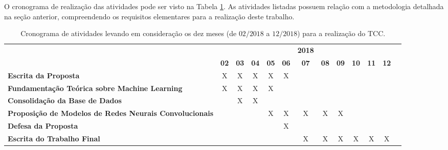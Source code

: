 
O cronograma de realização das atividades pode ser visto na Tabela \ref{tab:cronograma}. As atividades listadas possuem relação com a metodologia detalhada na seção anterior, compreendendo os requisitos elementares para a realização deste trabalho.
\newline

\begin{table}
\caption{Cronograma de atividades levando em consideração os dez meses (de $02/2018$ a $12/2018$) para a realização do TCC.}
\label{tab:cronograma}

\begin{center}
\begin{small}
\begin{tabular}{p{5cm}cccccccccccc}
  \toprule
  & &  &  & &  & \textbf{2018}  & &  &  &  &  & \\
                                        & \textbf{02} & \textbf{03} & \textbf{04} & \textbf{05} & \textbf{06} & \textbf{07} & \textbf{08} & \textbf{09} & \textbf{10} & \textbf{11} & \textbf{12} \\
  \midrule
  \textbf{Escrita da Proposta}          &      X      &      X      &      X      &      X      &      X      &             &             &             &             &             &             \\
  \textbf{Fundamentação Teórica sobre
  Machine Learning}                     &      X      &      X      &      X      &      X      &             &             &             &             &             &             &             \\
  \textbf{Consolidação da Base de Dados}&             &      X      &      X      &             &             &             &             &             &             &             &             \\
  \textbf{Proposição de Modelos de
  Redes Neurais Convolucionais}         &             &             &             &      X      &      X      &      X      &      X      &      X      &             &             &             \\
  \textbf{Defesa da Proposta}          &             &             &             &             &      X      &             &             &             &             &             &             \\
  \textbf{Escrita do Trabalho Final}    &             &             &             &             &             &      X      &      X      &      X      &      X      &      X      &      X      \\

\end{tabular}
\end{small}
\end{center}
\end{table}

